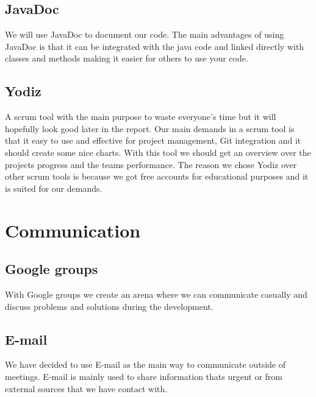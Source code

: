 \subsection{JavaDoc}
We will use JavaDoc to document our code. The main advantages of using JavaDoc is that it can be integrated with the java code and linked directly with classes and methods making it easier for others to use your code.

\subsection{Yodiz}
A scrum tool with the main purpose to waste everyone's time but it will hopefully look good later in the report. Our main demands in a scrum tool is that it easy to use and effective for project management, Git integration and it should create some nice charts. With this tool we should get an overview over the projects progress and the teams performance. The reason we chose Yodiz over other scrum tools is because we got free accounts for educational purposes and it is suited for our demands. 

\section{Communication}
\subsection{Google groups}
With Google groups we create an arena where we can communicate casually and discuss problems and solutions during the development.

\subsection{E-mail}
We have decided to use E-mail as the main way to communicate outside of meetings. E-mail is mainly used to share information thats urgent or from external sources that we have contact with.

